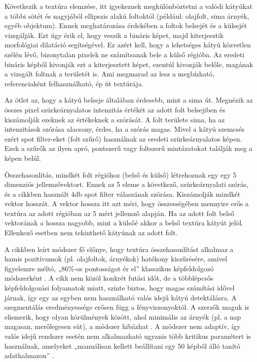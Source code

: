 Következik a textúra elemzése, itt igyekeznek megkülönböztetni a valódi
kátyúkat a többi sötét és nagyjából ellipszis alakú foltoktól (például:
olajfolt, sima árnyék, egyéb objektum). Ennek meghatározása érdekében a
foltok belsejét és a külsejét vizsgálják. Ezt úgy érik el, hogy veszik a
bináris képet, majd kiterjesztik morfológiai dilatáció segítségével. Ez
azért kell, hogy a lehetséges kátyú közvetlen szélén lévő, bizonytalan
pixelek ne számítsanak bele a külső régióba. Az eredeti bináris képből
kivonják ezt a kiterjesztett képet, ezentúl kivonják belőle, magának a
vizsgált foltnak a területét is. Ami megmarad az lesz a megbízható,
referenciaként felhasználható, ép út textúrája.

Az ötlet az, hogy a kátyú belseje általában érdesebb, mint a sima út.
Megnézik az összes pixel szürkeárnyalatos intenzitás értékét az adott
folt belsejiben és kiszámolják ezeknek az értékeknek a szórását. A folt
területe sima, ha az intenzitások szórása alacsony, érdes, ha a szórás
magas. Mivel a kátyú szemcsés ezért spot filter-eket (folt szűrő)
használnak az eredeti szürkeárnyalatos képen. Ezek a szűrők az ilyen
apró, pontszerű vagy foltszerű mintázatokat találják meg a képen belül.

Összehasonlítás, mindkét folt régióhoz (belső és külső) létrehoznak egy
egy 5 dimenziós jellemzővektort. Ennek az 5 eleme a következő,
szürkeárnyalati szórás, és a cikkben használt 4db spot filter válaszának
szórása. Kiszámolják mindkét vektor hosszát. A vektor hossza itt azt
méri, hogy összességében mennyire erős a textúra az adott régióban az 5
mért jellemző alapján. Ha az adott folt belső vektorának a hossza
nagyobb, mint a külsőé akkor a belső textúra kátyút jelöl. Ellenkező
esetben nem tekinthető kátyúnak az adott folt. \cite{kochPotholeDetectionAsphalt2011}

A cikkben leírt módszer fő előnye, hogy textúra összehasonlítást
alkalmaz a hamis pozitívumok (pl. olajfoltok, árnyékok) hatékony
kiszűrésére, amivel figyelemre méltó, „86\%-os pontosságot ér el''
klasszikus képfeldolgozó módszerként \cite{kochPotholeDetectionAsphalt2011}. A cikk nem közöl konkrét
futási időt, de a többlépcsős képfeldolgozási folyamatok miatt, szinte
biztos, hogy magas számítási idővel járnak, így egy az egyben nem
használható valós idejű kátyú detektálásra. A szegmentálás
eredményessége erősen függ a fényviszonyoktól. A szerzők maguk is
elismerik, hogy olyan körülmények között, ahol minimális az árnyék (pl.
a nap magasan, merőlegesen süt), a módszer hibázhat \cite{kochPotholeDetectionAsphalt2011}. A módszer
nem adaptív, így valós idejű rendszer esetén nem alkalmazható ugyanis
több kritikus paramétert is használnak, amelyeket „manuálisan kellett
beállítani egy 50 képből álló tanító adathalmazon'' \cite{kochPotholeDetectionAsphalt2011}.

